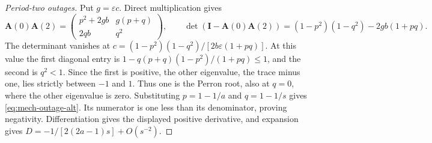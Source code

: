 \begin{proof}[Period-two outages]
Put \(g=\varepsilon c\). Direct multiplication gives
\begin{equation}\label{eq:mech-outage-product}
 \mathbf A(0)\mathbf A(2)=
 \begin{pmatrix}p^2+2gb&g(p+q)\\2qb&q^2\end{pmatrix},\qquad
 \det(\mathbf I-\mathbf A(0)\mathbf A(2))
 =(1-p^2)(1-q^2)-2gb(1+pq).
\end{equation}
The determinant vanishes at \(c=(1-p^2)(1-q^2)/[2b\varepsilon(1+pq)]\). At this value the first diagonal entry is
\(1-q(p+q)(1-p^2)/(1+pq)\leq1\), and the second is \(q^2<1\). Since the first is positive, the other eigenvalue, the trace minus one, lies strictly between \(-1\) and \(1\). Thus one is the Perron root, also at \(q=0\), where the other eigenvalue is zero. Substituting \(p=1-1/a\) and \(q=1-1/s\) gives \eqref{eq:mech-outage-alt}. Its numerator is one less than its denominator, proving negativity. Differentiation gives the displayed positive derivative, and expansion gives \(D=-1/[2(2a-1)s]+O(s^{-2})\).
\end{proof}


